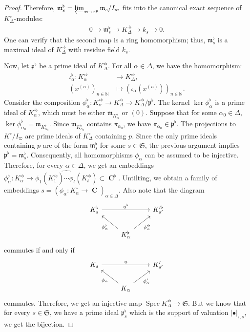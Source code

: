 \documentclass[12pts,a4paper]{amsart}
\DeclareMathOperator{\spec}{Spec}
\DeclareMathOperator{\C}{\textbf{C}}
\begin{document}
\begin{proof}
    Therefore, $\mathfrak{m}^\flat_s = \varprojlim_{x \mapsto x^p} \mathfrak{m}_s / I_\varpi$ fits into the canonical exact sequence of $K^\circ_\Delta$-modules:
    \begin{align*}
        0 \to \mathfrak{m}^\flat_s \to K^{\circ\flat}_\Delta \to k_s \to 0.
    \end{align*}
    One can verify that the second map is a ring homomorphism; thus, $\mathfrak{m}^\flat_s$ is a maximal ideal of $K^{\circ\flat}_\Delta$ with residue field $k_s$.

    Now, let $\mathfrak{p}^\flat$ be a prime ideal of $K^{\circ\flat}_\Delta$. For all $\alpha \in \Delta$, we have the homomorphism:
    \begin{align*}
        \iota^\flat_\alpha: K^{\circ\flat}_\alpha &\to K^{\circ\flat}_\Delta, \\
        (x^{(n)})_{n \in \mathbb{N}} &\mapsto (\iota_\alpha(x^{(n)}))_{n \in \mathbb{N}}.
    \end{align*}
    Consider the composition $\phi^\flat_\alpha: K^{\circ\flat}_\alpha \to K^{\circ\flat}_\Delta \to K^{\circ\flat}_\Delta / \mathfrak{p}^\flat$. The kernel $\ker \phi^\flat_\alpha$ is a prime ideal of $K^{\circ\flat}_\alpha$, which must be either $\mathfrak{m}_{K^\flat_\alpha}$ or $(0)$. Suppose that for some $\alpha_0 \in \Delta$, $\ker \phi^\flat_{\alpha_0} = \mathfrak{m}_{K^\flat_{\alpha_0}}$. Since $\mathfrak{m}_{K^\flat_{\alpha_0}}$ contains $\pi_{\alpha_0}$, we have $\pi_{\alpha_0} \in \mathfrak{p}^\flat$. The projections to $K^\circ / I_\varpi$ are prime ideals of $K^\circ_\Delta$ containing $p$. Since the only prime ideals containing $p$ are of the form $\mathfrak{m}^\flat_s$ for some $s \in \mathfrak{S}$, the previous argument implies $\mathfrak{p}^\flat = \mathfrak{m}^\flat_s$. Consequently, all homomorphisms $\phi_\alpha$ can be assumed to be injective. Therefore, for every $\alpha\in\Delta$, we get an embeddings $\phi^\flat_\alpha: K^{\circ\flat}_\alpha\to \widehat{\phi_1(K^{\circ\flat}_1)\cdots\phi_t(K^{\circ\flat}_t)}\subset\C^\flat$. Untilting, we obtain a family of embeddings $s=(\phi_\alpha: K^\circ_\alpha\to \C)_{\alpha\in\Delta}$. Also note that the diagram
    \[
    \begin{tikzcd}
        K^\flat_s\arrow[rr,"u^\flat"]&  &K'^\flat_{s'}\\
                     & \arrow[ul,"\phi^\flat_\alpha"]K^\flat_\alpha\arrow[ur,swap, "\phi'^\flat_\alpha"] &  
    \end{tikzcd}
    \]
    commutes if and only if 
    \[
    \begin{tikzcd}
        K_s\arrow[rr,"u"]&  &K'_{s'}\\
                     & \arrow[ul,"\phi_\alpha"]K_\alpha\arrow[ur,swap,"\phi'_\alpha"] &  
    \end{tikzcd}
    \]
    commutes. Therefore, we get an injective map $\spec K^{\circ\flat}_\Delta\to\mathfrak{S}$. But we know that for every $s\in\mathfrak{S}$, we have a prime ideal $\mathfrak{p}^\flat_s$ which is the support of valuation $|\bullet|_{\flat,s}$, we get the bijection. 
\end{proof}
\end{document}
